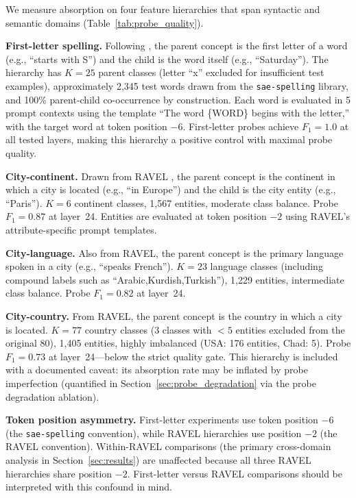 \documentclass{article}
\begin{document}
We measure absorption on four feature hierarchies that span syntactic and semantic domains (Table~\ref{tab:probe_quality}).

\textbf{First-letter spelling.} Following \citet{chanin2024absorption}, the parent concept is the first letter of a word (e.g., ``starts with S'') and the child is the word itself (e.g., ``Saturday''). The hierarchy has $K = 25$ parent classes (letter ``x'' excluded for insufficient test examples), approximately 2,345 test words drawn from the \texttt{sae-spelling} library, and 100\% parent-child co-occurrence by construction. Each word is evaluated in 5 prompt contexts using the template ``The word \{WORD\} begins with the letter,'' with the target word at token position $-6$. First-letter probes achieve $F_1 = 1.0$ at all tested layers, making this hierarchy a positive control with maximal probe quality.

\textbf{City-continent.} Drawn from RAVEL \citep{huang2024ravel}, the parent concept is the continent in which a city is located (e.g., ``in Europe'') and the child is the city entity (e.g., ``Paris''). $K = 6$ continent classes, 1,567 entities, moderate class balance. Probe $F_1 = 0.87$ at layer~24. Entities are evaluated at token position $-2$ using RAVEL's attribute-specific prompt templates.

\textbf{City-language.} Also from RAVEL, the parent concept is the primary language spoken in a city (e.g., ``speaks French''). $K = 23$ language classes (including compound labels such as ``Arabic,Kurdish,Turkish''), 1,229 entities, intermediate class balance. Probe $F_1 = 0.82$ at layer~24.

\textbf{City-country.} From RAVEL, the parent concept is the country in which a city is located. $K = 77$ country classes (3 classes with $< 5$ entities excluded from the original 80), 1,405 entities, highly imbalanced (USA: 176 entities, Chad: 5). Probe $F_1 = 0.73$ at layer~24---below the strict quality gate. This hierarchy is included with a documented caveat: its absorption rate may be inflated by probe imperfection (quantified in Section~\ref{sec:probe_degradation} via the probe degradation ablation).

\textbf{Token position asymmetry.} First-letter experiments use token position $-6$ (the \texttt{sae-spelling} convention), while RAVEL hierarchies use position $-2$ (the RAVEL convention). Within-RAVEL comparisons (the primary cross-domain analysis in Section~\ref{sec:results}) are unaffected because all three RAVEL hierarchies share position $-2$. First-letter versus RAVEL comparisons should be interpreted with this confound in mind.
\end{document}
